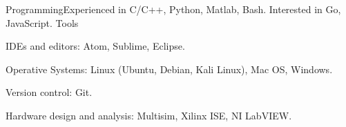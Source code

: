 \begin{cvskills}
	\cvskill
    	{Programming}{Experienced in C/C++, Python, Matlab, Bash. Interested in Go, JavaScript.}
	\cvskill
    	{Tools}{\item IDEs and editors: Atom, Sublime, Eclipse.
        		\item Operative Systems: Linux (Ubuntu, Debian, Kali Linux), Mac OS, Windows.
                \item Version control: Git.
                \item Hardware design and analysis: Multisim, Xilinx ISE, NI LabVIEW.
				}
\end{cvskills}

